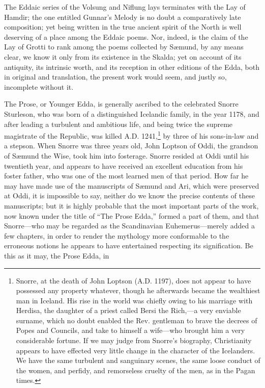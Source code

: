 The Eddaic series of the Volsung and Niflung lays terminates with the
Lay of Hamdir; the one entitled Gunnar's Melody is no doubt a
comparatively late composition; yet being written in the true ancient
spirit of the North is well deserving of a place among the Eddaic
poems. Nor, indeed, is the claim of the Lay of Grotti to rank among
the poems collected by Sæmund, by any means clear, we know it only
from its existence in the Skalda; yet on account of its antiquity, its
intrinsic worth, and its reception in other editions of the Edda, both
in original and translation, the present work would seem, and justly
so, incomplete without it.

The Prose, or Younger Edda, is generally ascribed to the celebrated
Snorre Sturleson, who was born of a distinguished Icelandic family, in
the year 1178, and after leading a turbulent and ambitious life, and
being twice the supreme magistrate of the Republic, was killed A.D.
1241,\footnote{Snorre, at the death of John Loptson (A.D. 1197), does
not appear to have possessed any property whatever, though he
afterwards became the wealthiest man in Iceland. His rise in the world
was chiefly owing to his marriage with Herdisa, the daughter of a
priest called Bersi the Rich,—a very enviable surname, which no doubt
enabled the Rev. gentleman to brave the decrees of Popes and Councils,
and take to himself a wife—who brought him a very considerable
fortune. If we may judge from Snorre's biography, Christianity appears
to have effected very little change in the character of the
Icelanders. We have the same turbulent and sanguinary scenes, the same
loose conduct of the women, and perfidy, and remorseless cruelty of
the men, as in the Pagan times.} by three of his sons-in-law and a stepson. When Snorre was
three years old, John Loptson of Oddi, the grandson of Sæmund the
Wise, took him into fosterage. Snorre resided at Oddi until his
twentieth year, and appears to have received an excellent education
from his foster father, who was one of the most learned men of that
period. How far he may have made use of the manuscripts of Sæmund and
Ari, which were preserved at Oddi, it is impossible to say, neither do
we know the precise contents of these manuscripts; but it is highly
probable that the most important parts of the work, now known under
the title of ``The Prose Edda,'' formed a part of them, and that
Snorre—who may be regarded as the Scandinavian Euhemerus—merely
added a few chapters, in order to render the mythology more
conformable to the erroneous notions he appears to have entertained
respecting its signification. Be this as it may, the Prose Edda, in
